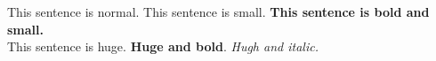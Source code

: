 \documentclass[12pt]{article}
\begin{document}
	{This sentence is normal. \small This sentence is small. \textbf{
This sentence is bold and small.}} \\

{\huge This sentence is huge. \textbf{Huge and bold}. \textit{Hugh and italic.}}
\end{document}
